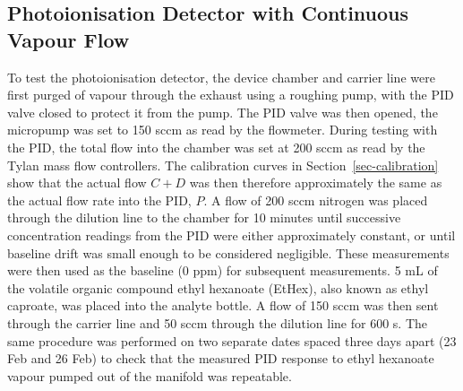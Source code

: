 \documentclass[
  a4paper,
]{scrbook}
\begin{document}
\hypertarget{photoionisation-detector-with-continuous-vapour-flow}{%
\subsection{Photoionisation Detector with Continuous Vapour
Flow}\label{photoionisation-detector-with-continuous-vapour-flow}}

To test the photoionisation detector, the device chamber and carrier
line were first purged of vapour through the exhaust using a roughing
pump, with the PID valve closed to protect it from the pump. The PID
valve was then opened, the micropump was set to 150 sccm as read by the
flowmeter. During testing with the PID, the total flow into the chamber
was set at 200 sccm as read by the Tylan mass flow controllers. The
calibration curves in Section~\ref{sec-calibration} show that the actual
flow \(C + D\) was then therefore approximately the same as the actual
flow rate into the PID, \(P\). A flow of 200 sccm nitrogen was placed
through the dilution line to the chamber for 10 minutes until successive
concentration readings from the PID were either approximately constant,
or until baseline drift was small enough to be considered negligible.
These measurements were then used as the baseline (0 ppm) for subsequent
measurements. 5 mL of the volatile organic compound ethyl hexanoate
(EtHex), also known as ethyl caproate, was placed into the analyte
bottle. A flow of 150 sccm was then sent through the carrier line and 50
sccm through the dilution line for 600 s. The same procedure was
performed on two separate dates spaced three days apart (23 Feb and 26
Feb) to check that the measured PID response to ethyl hexanoate vapour
pumped out of the manifold was repeatable.
\end{document}
